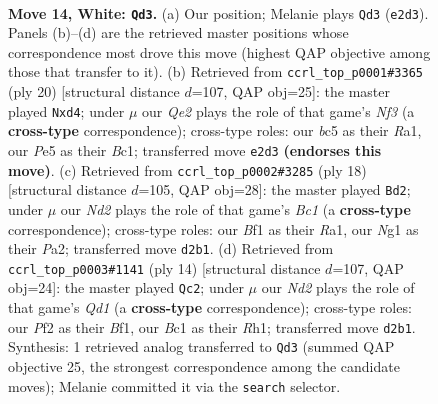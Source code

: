 \documentclass[11pt]{article}
\begin{document}
\begin{figure}[p]
\label{fig:thought-m24}
\end{figure}

\clearpage

\begin{figure}[p]\centering
\begin{subfigure}{0.46\textwidth}\centering
\resizebox{\linewidth}{!}{%
\newchessgame
\chessboard[
  setfen={r3k1nr/1p1b4/1q2p3/p1bpPp1p/2Pn2p1/P7/1P1NQPPP/R1B1KBNR w Kkq - 1 14},
  showmover=false,
  pgfstyle=straightmove, color=movearrow, markmove={e2-d3}
]}
\caption{}
\end{subfigure}\hfill
\begin{subfigure}{0.46\textwidth}\centering
\resizebox{\linewidth}{!}{%
\newchessgame
\chessboard[
  setfen={r1bqkbnr/pp6/2pp4/4pp2/2PnP2p/2NP1N1P/PP3PB1/R1BQK2R w KQkq - 0 11},
  showmover=false,
  pgfstyle=straightmove, color=movearrow, markmove={f3-d4}
]}
\caption{}
\end{subfigure}
\\[4pt]
\begin{subfigure}{0.46\textwidth}\centering
\resizebox{\linewidth}{!}{%
\newchessgame
\chessboard[
  setfen={rnbr2k1/pp2ppb1/1qp2npp/3p4/2PP4/1QN2NPP/PP2PPB1/R1B2RK1 w - - 0 10},
  showmover=false,
  pgfstyle=straightmove, color=movearrow, markmove={c1-d2}
]}
\caption{}
\end{subfigure}\hfill
\begin{subfigure}{0.46\textwidth}\centering
\resizebox{\linewidth}{!}{%
\newchessgame
\chessboard[
  setfen={r1b1k2r/pp1n1ppp/2p1pn2/q2p2B1/1bPP4/2N1P3/PP1N1PPP/R2QKB1R w KQkq - 3 8},
  showmover=false,
  pgfstyle=straightmove, color=movearrow, markmove={d1-c2}
]}
\caption{}
\end{subfigure}
\caption{\textbf{Move 14, White: \texttt{Qd3}.} (a) Our position; Melanie plays \texttt{Qd3} (\texttt{e2d3}). Panels (b)--(d) are the retrieved master positions whose correspondence most drove this move (highest QAP objective among those that transfer to it). (b) Retrieved from \texttt{ccrl\_top\_p0001\#3365} (ply 20) [structural distance $d$=107, QAP obj=25]: the master played \texttt{Nxd4}; under $\mu$ our \emph{Qe2} plays the role of that game's \emph{Nf3} (a \textbf{cross-type} correspondence); cross-type roles: our \emph{b}c5 as their \emph{R}a1, our \emph{P}e5 as their \emph{B}c1; transferred move \texttt{e2d3} \textbf{(endorses this move)}. (c) Retrieved from \texttt{ccrl\_top\_p0002\#3285} (ply 18) [structural distance $d$=105, QAP obj=28]: the master played \texttt{Bd2}; under $\mu$ our \emph{Nd2} plays the role of that game's \emph{Bc1} (a \textbf{cross-type} correspondence); cross-type roles: our \emph{B}f1 as their \emph{R}a1, our \emph{N}g1 as their \emph{P}a2; transferred move \texttt{d2b1}. (d) Retrieved from \texttt{ccrl\_top\_p0003\#1141} (ply 14) [structural distance $d$=107, QAP obj=24]: the master played \texttt{Qc2}; under $\mu$ our \emph{Nd2} plays the role of that game's \emph{Qd1} (a \textbf{cross-type} correspondence); cross-type roles: our \emph{P}f2 as their \emph{B}f1, our \emph{B}c1 as their \emph{R}h1; transferred move \texttt{d2b1}. Synthesis: 1 retrieved analog transferred to \texttt{Qd3} (summed QAP objective 25, the strongest correspondence among the candidate moves); Melanie committed it via the \texttt{search} selector.}

\end{figure}
\end{document}
